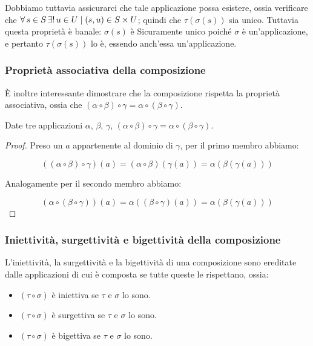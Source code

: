 Dobbiamo tuttavia assicurarci che tale applicazione
possa esistere, ossia verificare che $\forall s \in S \existsone
    u \in U \mid (s, u) \in S \times U$; quindi che $\tau(\sigma(s))$
sia unico. Tuttavia questa proprietà è banale: $\sigma(s)$ è Sicuramente
unico poiché $\sigma$ è un'applicazione, e pertanto $\tau(\sigma(s))$ lo è,
essendo anch'essa un'applicazione.

\subsubsection{Proprietà associativa della composizione}

È inoltre interessante dimostrare che la composizione rispetta la proprietà associativa,
ossia che $(\alpha \circ \beta) \circ \gamma = \alpha \circ (\beta \circ \gamma)$.

\begin{lemma}
    Date tre applicazioni $\alpha$, $\beta$, $\gamma$,
    $(\alpha \circ \beta) \circ \gamma = \alpha \circ (\beta \circ \gamma)$.
\end{lemma}

\begin{proof}
    Preso un $a$ appartenente al dominio di $\gamma$, per il primo membro abbiamo:

    $$((\alpha \circ \beta) \circ \gamma)(a) = (\alpha \circ \beta)(\gamma(a)) =
        \alpha(\beta(\gamma(a)))$$

    Analogamente per il secondo membro abbiamo:

    $$(\alpha \circ (\beta \circ \gamma))(a) = \alpha((\beta \circ \gamma)(a)) =
        \alpha(\beta(\gamma(a)))$$
\end{proof}

\subsubsection{Iniettività, surgettività e bigettività della composizione}

L'iniettività, la surgettività e la bigettività di una composizione sono
ereditate dalle applicazioni di cui è composta se tutte queste le rispettano, ossia:

\begin{itemize}
    \item $(\tau \circ \sigma)$ è iniettiva se $\tau$ e $\sigma$ lo sono.
    \item $(\tau \circ \sigma)$ è surgettiva se $\tau$ e $\sigma$ lo sono.
    \item $(\tau \circ \sigma)$ è bigettiva se $\tau$ e $\sigma$ lo sono.
\end{itemize}

